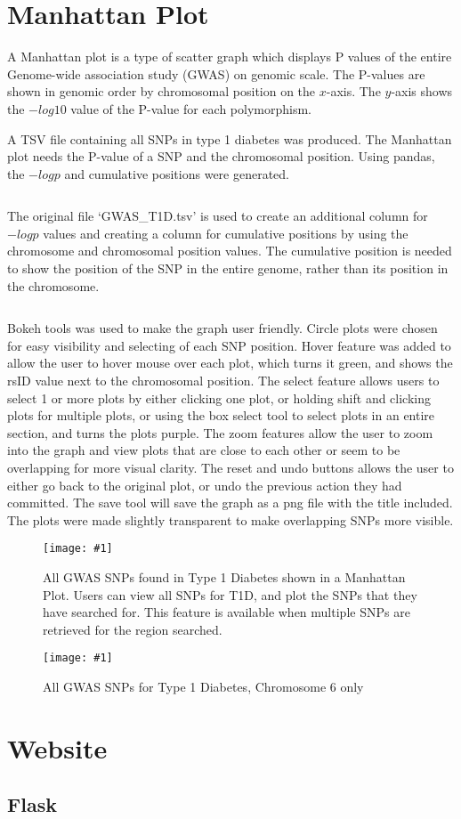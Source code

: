 \documentclass[12pt,a4paper]{article}
\newcommand{\mintfile}[1]{
\begin{tcolorbox}[colback=gray!5!white,%
	grow to left by=20mm,
    grow to right by=20mm,
    sharp corners]{{    \small \inputminted[breaklines]{python}{#1}		}}
\end{tcolorbox}}
\newcommand{\sect}[1]{
\clearpage
\hypertarget{#1}{
\section{#1}\label{#1}}
}
\newcommand{\subsect}[1]{
\FloatBarrier %
\hypertarget{#1}{
\subsection{#1}\label{#1}}
}
\newcommand{\pic}[2]{
\begin{figure}[h]
    \centering
    \captionsetup{justification=centering}
    \texttt{[image: \#1]}
    \caption{#2}
    \label{#1}
\end{figure}
}
\begin{document}
\sect{Manhattan Plot}

A Manhattan plot is a type of scatter graph which displays P values of the entire Genome-wide association study (GWAS) on genomic scale. The P-values are shown in genomic order by chromosomal position on the $x$-axis. The $y$-axis shows the $-log10$ value of the P-value for each polymorphism.

A TSV file containing all SNPs in type 1 diabetes was produced. The Manhattan plot needs the P-value of a SNP and the chromosomal position. Using pandas, the $-logp$ and cumulative positions were generated.

\mintfile{code_snippets/manPlot/createTSV.py}
The original file `GWAS\_T1D.tsv’ is used to create an additional column for $-logp$ values and creating a column for cumulative positions by using the chromosome and chromosomal position values.
The cumulative position is needed to show the position of the SNP in the entire genome, rather than its position in the chromosome.

\mintfile{code_snippets/manPlot/createManPlot.py}
Bokeh tools was used to make the graph user friendly. Circle plots were chosen for easy visibility and selecting of each SNP position. Hover feature was added to allow the user to hover mouse over each plot, which turns it green, and shows the rsID value next to the chromosomal position. The select feature allows users to select 1 or more plots by either clicking one plot, or holding shift and clicking plots for multiple plots, or using the box select tool to select plots in an entire section, and turns the plots purple. The zoom features allow the user to zoom into the graph and view plots that are close to each other or seem to be overlapping for more visual clarity. The reset and undo buttons allows the user to either go back to the original plot, or undo the previous action they had committed. The save tool will save the graph as a png file with the title included. The plots were made slightly transparent to make overlapping SNPs more visible.

\pic{manplot1}{All GWAS SNPs found in Type 1 Diabetes shown in a Manhattan Plot.
Users can view all SNPs for T1D, and plot the SNPs that they have searched for.
This feature is available when multiple SNPs are retrieved for the region searched.}

\pic{manplot2}{All GWAS SNPs for Type 1 Diabetes, Chromosome 6 only}

\sect{Website}

\subsect{Flask}
\end{document}
